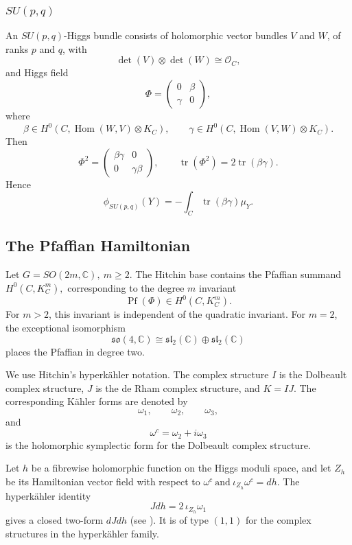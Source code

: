 \documentclass[11pt,reqno]{amsart}
\numberwithin{equation}{section}
\theoremstyle{plain}
\theoremstyle{definition}
\theoremstyle{remark}
\begin{document}
\subsubsection{\texorpdfstring{\(SU(p,q)\)}{SU(p,q)}}

An \(SU(p,q)\)-Higgs bundle consists of holomorphic vector bundles \(V\) and
\(W\), of ranks \(p\) and \(q\), with
\[
        \det(V)\otimes\det(W)\cong\mathcal O_C,
\]
and Higgs field
\[
        \Phi=
        \begin{pmatrix}
        0&\beta\\
        \gamma&0
        \end{pmatrix},
\]
where
\[
        \beta\in H^0(C,\operatorname{Hom}(W,V)\otimes K_C),
        \qquad
        \gamma\in H^0(C,\operatorname{Hom}(V,W)\otimes K_C).
\]
Then
\[
        \Phi^2=
        \begin{pmatrix}
        \beta\gamma&0\\
        0&\gamma\beta
        \end{pmatrix},
        \qquad
        \operatorname{tr}(\Phi^2)
        =
        2\operatorname{tr}(\beta\gamma).
\]
Hence
\[
        \phi_{SU(p,q)}(Y)
        =
        -\int_C\operatorname{tr}(\beta\gamma)\mu_Y.
\]


\subsection{The Pfaffian Hamiltonian}

Let
\(
        G=SO(2m,\mathbb C),\ m\geq 2.
\)
The Hitchin base contains the Pfaffian summand
\(
        H^0(C,K_C^m),
\)
corresponding to the degree \(m\) invariant
\[
        \operatorname{Pf}(\Phi)\in H^0(C,K_C^m).
\]
For \(m>2\), this invariant is independent of the quadratic invariant.  For
\(m=2\), the exceptional isomorphism
\[
        \mathfrak{so}(4,\mathbb C)\cong
        \mathfrak{sl}_2(\mathbb C)\oplus\mathfrak{sl}_2(\mathbb C)
\]
places the Pfaffian in degree two.

We use Hitchin's hyperk\"ahler notation.  The complex structure \(I\) is the
Dolbeault complex structure, \(J\) is the de Rham complex structure, and
\(K=IJ\).  The corresponding K\"ahler forms are denoted by
\[
        \omega_1,\qquad \omega_2,\qquad \omega_3,
\]
and
\[
        \omega^c=\omega_2+i\omega_3
\]
is the holomorphic symplectic form for the Dolbeault complex structure.

Let \(h\) be a fibrewise holomorphic function on the Higgs moduli space, and
let \(Z_h\) be its Hamiltonian vector field with respect to
\(
        \omega^c
        \ \text{and}\
        \iota_{Z_h}\omega^c=dh.
\)
The hyperk\"ahler identity
\[
        Jdh=2\,\iota_{Z_h}\omega_1
\]
gives a closed two-form
\(
        dJdh
\)
(see \cite[Sec.~2.3]{HitchinUniversal}). It is of type \((1,1)\) for the complex structures in the hyperk\"ahler family. 
\end{document}
